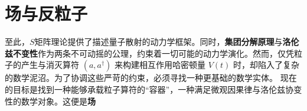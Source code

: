 \chapter{场与反粒子}
\color{blue}
至此，$S$矩阵理论提供了描述量子散射的动力学框架。同时，\textbf{集团分解原理}与\textbf{洛伦兹不变性}作为两条不可动摇的公理，约束着一切可能的动力学演化。然而，仅凭粒子的产生与消灭算符 $(a, a^\dagger)$ 来构建相互作用哈密顿量 $V(t)$ 时，却陷入了复杂的数学泥沼。为了协调这些严苛的约束，必须寻找一种更基础的数学实体。
现在的目标是找到一种能够承载粒子算符的“容器”，一种满足微观因果律与洛伦兹协变性的数学对象。这便是\textbf{场}\normalcolor



